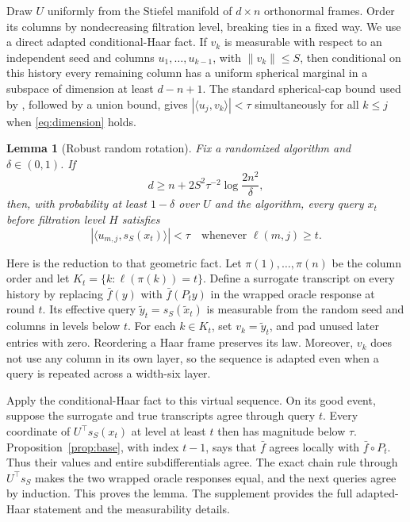 \documentclass[twoside]{article}
\newtheorem{lemma}[theorem]{Lemma}
\begin{document}
Draw $U$ uniformly from the Stiefel manifold of $d\times n$ orthonormal frames. Order its columns by nondecreasing filtration level, breaking ties in a fixed way. We use a direct adapted conditional-Haar fact. If $v_k$ is measurable with respect to an independent seed and columns $u_1,\ldots,u_{k-1}$, with $\|v_k\|\leq S$, then conditional on this history every remaining column has a uniform spherical marginal in a subspace of dimension at least $d-n+1$. The standard spherical-cap bound used by \citet[Appendix~B.3]{carmon2020stationary}, followed by a union bound, gives $|\langle u_j,v_k\rangle|<\tau$ simultaneously for all $k\leq j$ when \eqref{eq:dimension} holds.

\begin{lemma}[Robust random rotation]
\label{lem:rotation}
Fix a randomized algorithm and $\delta\in(0,1)$. If
\begin{equation}
 d\geq n+2S^2\tau^{-2}\log\frac{2n^2}{\delta},
 \label{eq:dimension}
\end{equation}
then, with probability at least $1-\delta$ over $U$ and the algorithm, every query $x_t$ before filtration level $H$ satisfies \[ |\langle u_{m,j},s_S(x_t)\rangle|<\tau \quad\text{whenever }\ell(m,j)\geq t. \]
\end{lemma}

Here is the reduction to that geometric fact. Let $\pi(1),\ldots,\pi(n)$ be the column order and let $K_t=\{k:\ell(\pi(k))=t\}$. Define a surrogate transcript on every history by replacing $\bar f(y)$ with $\bar f(P_ty)$ in the wrapped oracle response at round $t$. Its effective query $\widetilde y_t=s_S(\widetilde x_t)$ is measurable from the random seed and columns in levels below $t$. For each $k\in K_t$, set $v_k=\widetilde y_t$, and pad unused later entries with zero. Reordering a Haar frame preserves its law. Moreover, $v_k$ does not use any column in its own layer, so the sequence is adapted even when a query is repeated across a width-six layer.

Apply the conditional-Haar fact to this virtual sequence. On its good event, suppose the surrogate and true transcripts agree through query $t$. Every coordinate of $U^\top s_S(x_t)$ at level at least $t$ then has magnitude below $\tau$. Proposition~\ref{prop:base}, with index $t-1$, says that $\bar f$ agrees locally with $\bar f\circ P_t$. Thus their values and entire subdifferentials agree. The exact chain rule through $U^\top s_S$ makes the two wrapped oracle responses equal, and the next queries agree by induction. This proves the lemma. The supplement provides the full adapted-Haar statement and the measurability details.
\end{document}
